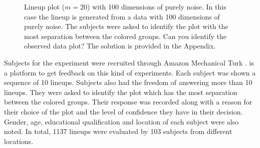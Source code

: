 \documentclass[12]{article}
\begin{document}
\begin{figure}[hbtp]
   \centering
       \caption{Lineup plot ($m=20$) with 100 dimensions of purely noise. In this case the lineup is generated from a data with 100 dimensions of purely noise. The subjects were asked to identify the plot with the most separation between the colored groups. Can you identify the observed data plot? The solution is provided in the Appendix. }
       \label{fig:test_category}
\end{figure}

Subjects  for the experiment were recruited through Amazon Mechanical Turk  \citep{turk}.  \cite{turk} is a platform to get feedback on this kind of experiments. Each subject was shown a sequence of 10 lineups. Subjects also had the freedom of answering more than 10 lineups. They were asked to identify the plot which has the most separation between the colored groups. Their response was recorded along with a reason for their choice of the plot and the level of confidence they have in their decision.  Gender, age, educational qualification and location of each subject were also noted. In total, 1137 lineups were evaluated by 103 subjects from different locations.


\end{document}
